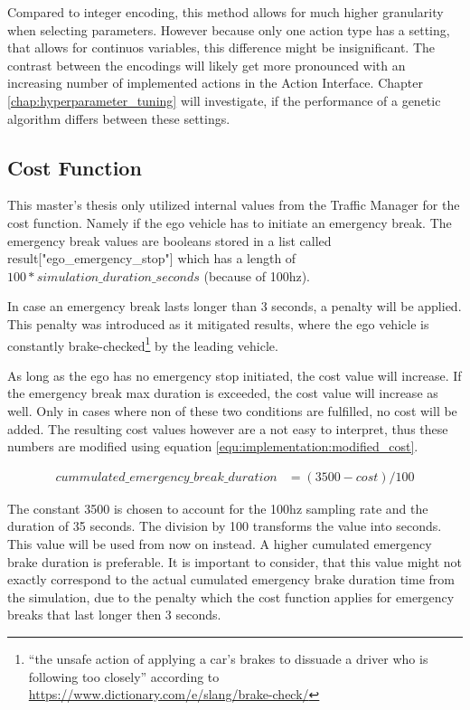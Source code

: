 Compared to integer encoding, this method allows for much higher granularity when selecting parameters. However because only one action type has a setting, that allows for continuos variables, this difference might be insignificant. The contrast between the encodings will likely get more pronounced with an increasing number of implemented actions in the Action Interface. Chapter \ref{chap:hyperparameter_tuning} will investigate, if the performance of a genetic algorithm differs between these settings.

\subsection{Cost Function}
\label{sect:implementation:cost_function}
This master's thesis only utilized internal values from the Traffic Manager for the cost function. Namely if the ego vehicle has to initiate an emergency break. The emergency break values are booleans stored in a list called result["ego\_emergency\_stop"] which has a length of $100 * simulation\_duration\_seconds$ (because of 100hz). 

In case an emergency break lasts longer than 3 seconds, a penalty will be applied. This penalty was introduced as it mitigated results, where the ego vehicle is constantly brake-checked\footnote{\enquote{the unsafe action of applying a car’s brakes to dissuade a driver who is following too closely} according to \href{https://www.dictionary.com/e/slang/brake-check/}{https://www.dictionary.com/e/slang/brake-check/}} by the leading vehicle.

As long as the ego has no emergency stop initiated, the cost value will increase. If the emergency break max duration is exceeded, the cost value will increase as well. Only in cases where non of these two conditions are fulfilled, no cost will be added. The resulting cost values however are a not easy to interpret, thus these numbers are modified using equation \ref{equ:implementation:modified_cost}.

\begin{equation} 
	\label{equ:implementation:modified_cost}
	\begin{split}
		cummulated\_emergency\_break\_duration & = (3500 - cost) / 100
	\end{split}
\end{equation}

The constant 3500 is chosen to account for the 100hz sampling rate and the duration of 35 seconds. The division by 100 transforms the value into seconds. This value will be used from now on instead. A higher cumulated emergency brake duration is preferable. It is important to consider, that this value might not exactly correspond to the actual cumulated emergency brake duration time from the simulation, due to the penalty which the cost function applies for emergency breaks that last longer then 3 seconds.

